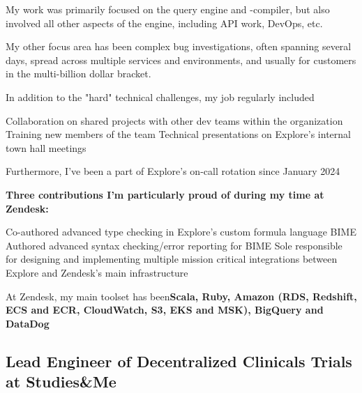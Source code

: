 \documentclass[10pt, a4paper]{article}
\newcommand{\sme}{Studies\&Me}
\begin{document}
My work was primarily focused on the query engine and -compiler, but also involved all other aspects of the engine, including API work, DevOps, etc.

My other focus area has been complex bug investigations, often spanning several days, spread across multiple services and environments, and usually for customers in the multi-billion dollar bracket.

In addition to the "hard" technical challenges, my job regularly included 
\begin{outline}
 \1 Collaboration on shared projects with other dev teams within the organization
 \1 Training new members of the team
 \1 Technical presentations on Explore's internal town hall meetings
\end{outline}
Furthermore, I've been a part of Explore's on-call rotation since January 2024

\textbf{Three contributions I'm particularly proud of during my time at Zendesk:}
\begin{outline}
\1 Co-authored  advanced type checking in Explore's custom formula language BIME
\1 Authored advanced syntax checking/error reporting for BIME
\1 Sole responsible for designing and implementing multiple mission critical integrations between Explore and Zendesk's main infrastructure
\end{outline}
    {\footnotesize At Zendesk, my main toolset has been\newline \textbf{Scala, Ruby, Amazon (RDS, Redshift, ECS and ECR, CloudWatch, S3, EKS and MSK), BigQuery and DataDog}}

\subsection*{Lead Engineer of Decentralized Clinicals Trials at \sme}
\end{document}
